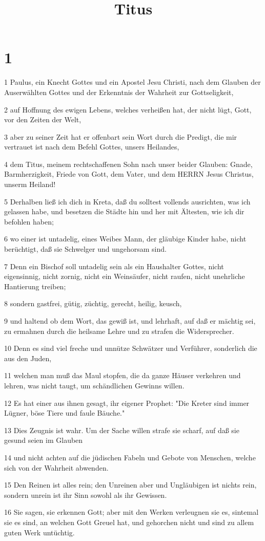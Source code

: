 

\title{Titus}


\chapter{1}

\par 1 Paulus, ein Knecht Gottes und ein Apostel Jesu Christi, nach dem Glauben der Auserwählten Gottes und der Erkenntnis der Wahrheit zur Gottseligkeit,
\par 2 auf Hoffnung des ewigen Lebens, welches verheißen hat, der nicht lügt, Gott, vor den Zeiten der Welt,
\par 3 aber zu seiner Zeit hat er offenbart sein Wort durch die Predigt, die mir vertrauet ist nach dem Befehl Gottes, unsers Heilandes,
\par 4 dem Titus, meinem rechtschaffenen Sohn nach unser beider Glauben: Gnade, Barmherzigkeit, Friede von Gott, dem Vater, und dem HERRN Jesus Christus, unserm Heiland!
\par 5 Derhalben ließ ich dich in Kreta, daß du solltest vollends ausrichten, was ich gelassen habe, und besetzen die Städte hin und her mit Ältesten, wie ich dir befohlen haben;
\par 6 wo einer ist untadelig, eines Weibes Mann, der gläubige Kinder habe, nicht berüchtigt, daß sie Schwelger und ungehorsam sind.
\par 7 Denn ein Bischof soll untadelig sein als ein Haushalter Gottes, nicht eigensinnig, nicht zornig, nicht ein Weinsäufer, nicht raufen, nicht unehrliche Hantierung treiben;
\par 8 sondern gastfrei, gütig, züchtig, gerecht, heilig, keusch,
\par 9 und haltend ob dem Wort, das gewiß ist, und lehrhaft, auf daß er mächtig sei, zu ermahnen durch die heilsame Lehre und zu strafen die Widersprecher.
\par 10 Denn es sind viel freche und unnütze Schwätzer und Verführer, sonderlich die aus den Juden,
\par 11 welchen man muß das Maul stopfen, die da ganze Häuser verkehren und lehren, was nicht taugt, um schändlichen Gewinns willen.
\par 12 Es hat einer aus ihnen gesagt, ihr eigener Prophet: "Die Kreter sind immer Lügner, böse Tiere und faule Bäuche."
\par 13 Dies Zeugnis ist wahr. Um der Sache willen strafe sie scharf, auf daß sie gesund seien im Glauben
\par 14 und nicht achten auf die jüdischen Fabeln und Gebote von Menschen, welche sich von der Wahrheit abwenden.
\par 15 Den Reinen ist alles rein; den Unreinen aber und Ungläubigen ist nichts rein, sondern unrein ist ihr Sinn sowohl als ihr Gewissen.
\par 16 Sie sagen, sie erkennen Gott; aber mit den Werken verleugnen sie es, sintemal sie es sind, an welchen Gott Greuel hat, und gehorchen nicht und sind zu allem guten Werk untüchtig.

